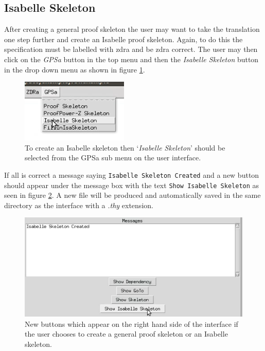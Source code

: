 \subsection{Isabelle Skeleton}

After creating a general proof skeleton the user may want to take the
translation one step further and create an Isabelle proof skeleton. Again, to do
this the specification must be labelled with \gls{zdra} and be \gls{zdra}
correct. The user may then click on the \emph{GPSa} button in the top menu and
then the \emph{Isabelle Skeleton} button in the drop down menu as shown in
figure \ref{fig:converttoisa}.

\begin{figure}[H]
\centering
\includegraphics[scale=0.8]{Figures/Interface/isskeleton.png}
\caption{To create an Isabelle skeleton then `\textit{Isabelle Skeleton}' should be selected from the GPSa sub menu on the user interface. \label{fig:converttoisa}}
\end{figure}

If all is correct a message saying \texttt{Isabelle Skeleton Created} and a new
button should appear under the message box with the text \texttt{Show Isabelle
Skeleton} as seen in figure \ref{fig:showskeleton}. A new file will be produced
and automatically saved in the same directory as the interface with a
\emph{.thy} extension.

\begin{figure}[H]
\centering
\includegraphics[scale=0.7]{Figures/Interface/showsaskeleton.png}
\caption{New buttons which appear on the right hand side of the interface if the user chooses to create a general proof skeleton or an Isabelle skeleton. \label{fig:showskeleton}}
\end{figure}

